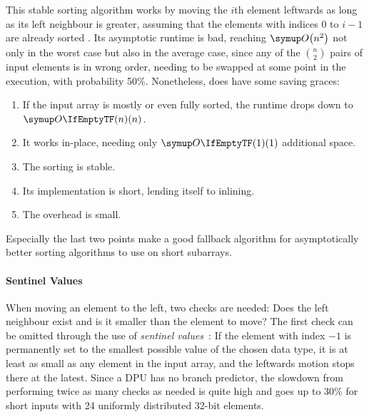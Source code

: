 \section{\texorpdfstring{\IS{}}{InsertionSort}}
\label{sec:tasklet:insertion}

This stable sorting algorithm works by moving the \(i\)th element leftwards as long as its left neighbour is greater, assuming that the elements with indices \(0\) to \(i - 1\) are already sorted \cites[83]{maurer1974datenstrukturen}[Chapter~2.2.1]{wirth1975algorithmen}.
Its asymptotic runtime is bad, reaching \(\bigoh*{n^2}\) not only in the worst case but also in the average case, since any of the \(\binom{n}{2}\) pairs of input elements is in wrong order, needing to be swapped at some point in the execution, with probability 50\%.
Nonetheless, \IS{} does have some saving graces:
\begin{enumerate}
	\item
	If the input array is mostly or even fully sorted, the runtime drops down to \(\bigoh{n}\).

	\item
	It works in-place, needing only \(\bigoh{1}\) additional space.

	\item
	The sorting is stable.

	\item
	Its implementation is short, lending itself to inlining.

	\item
	The overhead is small.
\end{enumerate}
Especially the last two points make \IS{} a good fallback algorithm for asymptotically better sorting algorithms to use on short subarrays.


\paragraph{Sentinel Values}
When moving an element to the left, two checks are needed:
Does the left neighbour exist and is it smaller than the element to move?
The first check can be omitted through the use of \emph{sentinel values}~\cites{penschuck2024personal}[93]{wirth1975algorithmen}:
If the element with index \(-1\) is permanently set to the smallest possible value of the chosen data type, it is at least as small as any element in the input array, and the leftwards motion stops there at the latest.
Since a DPU has no branch predictor, the slowdown from performing twice as many checks as needed is quite high and goes up to 30\% for short inputs with 24 uniformly distributed 32-bit elements.

